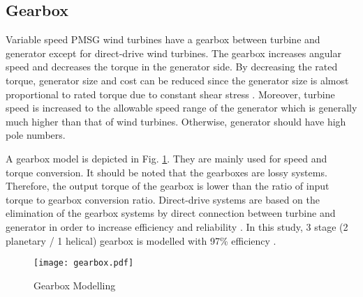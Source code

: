 \subsection{Gearbox}  
Variable speed PMSG wind turbines have a gearbox between turbine and generator except for direct-drive wind turbines. The gearbox increases angular speed and decreases the torque in the generator side. By decreasing the rated torque, generator size and cost can be reduced since the generator size is almost proportional to rated torque due to constant shear stress \cite{Polinder2013aa}. Moreover, turbine speed is increased to the allowable speed range of the generator which is generally much higher than that of wind turbines. Otherwise, generator should have high pole numbers. \par
A gearbox model is depicted in Fig. \ref{gearboxmodel}. They are mainly used for speed and torque conversion. It should be noted that the gearboxes are lossy systems. Therefore, the output torque of the gearbox is lower than the ratio of input torque to gearbox conversion ratio. Direct-drive systems are based on the elimination of the gearbox systems by direct connection between turbine and generator in order to increase efficiency and reliability \cite{Chen2009b}. In this study, 3 stage (2 planetary / 1 helical) gearbox is modelled with 97\% efficiency \cite{UKONSAARI2016}. 
\begin{figure}[h!]
	\centering
	\texttt{[image: gearbox.pdf]}
	\caption{Gearbox Modelling}
	\label{gearboxmodel}
\end{figure}
